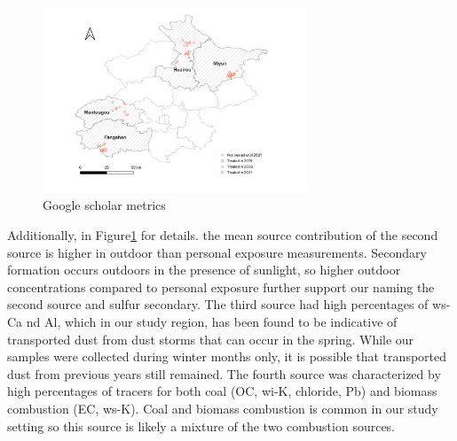 \documentclass[
  letterpaper,
  DIV=11,
  numbers=noendperiod]{scrartcl}
\begin{document}
\begin{figure}
\includegraphics[width=0.7\textwidth]{images/policy-implementation-map.png}
\caption{\label{fig-map}{Google scholar metrics}}
\end{figure}

Additionally, in Figure\ref{fig-map} for details. the mean source
contribution of the second source is higher in outdoor than personal
exposure measurements. Secondary formation occurs outdoors in the
presence of sunlight, so higher outdoor concentrations compared to
personal exposure further support our naming the second source and
sulfur secondary. The third source had high percentages of ws-Ca nd Al,
which in our study region, has been found to be indicative of
transported dust from dust storms that can occur in the spring. While
our samples were collected during winter months only, it is possible
that transported dust from previous years still remained. The fourth
source was characterized by high percentages of tracers for both coal
(OC, wi-K, chloride, Pb) and biomass combustion (EC, ws-K). Coal and
biomass combustion is common in our study setting so this source is
likely a mixture of the two combustion sources.
\end{document}
